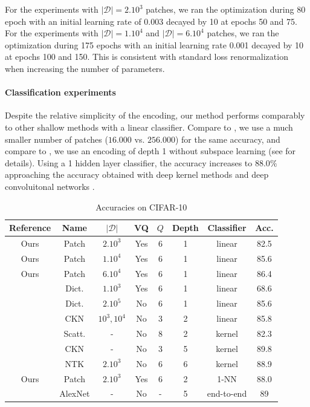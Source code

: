 \documentclass{article}
\begin{document}
{For the experiments with $|\mathcal{D}|=2. 10^3$ patches, we ran the optimization during 80 epoch with an initial learning rate of 0.003 decayed by 10 at epochs 50 and 75.
For the experiments with $|\mathcal{D}|=1.10^4$ and $|\mathcal{D}|=6. 10^4$ patches, we ran the optimization during 175 epochs with an initial learning rate 0.001 decayed by 10 at epochs 100 and  150. This is consistent with standard loss renormalization when increasing the number of parameters.


\paragraph{Classification experiments} Despite the relative simplicity of the encoding, our method performs comparably to other shallow methods with a linear classifier.
Compare to \cite{recht2019imagenet},  we use a much smaller number of patches ($16.000$ vs. $256.000$) for the same accuracy, and compare to \cite{mairal2016end}, we use an encoding of depth 1 without subspace learning (see \cite{mairal2016end} for details).
Using a 1 hidden layer classifier, the accuracy increases to $88.0 \%$ approaching the accuracy obtained with deep kernel methods \citep{li2019enhanced,shankar2020neural} and deep convoluitonal networks \citep{krizhevsky2012imagenet}.



\begin{table}[h]
  \caption{Accuracies on CIFAR-10}
  \label{accuracy}
  \centering
  \begin{tabular}{|c|c|c|c|c|c|c|c|}
    \hline 
    Reference&Name&$|\mathcal{D}|$&VQ&$Q$&Depth &Classifier& Acc. \\
    \hline 
    \hline 
    Ours&Patch&$2.10^3$ & Yes&6&1&linear&82.5 \\
    \hdashline[0.5pt/1pt]
    Ours&Patch&$1.10^4$ & Yes&6&1&linear&85.6\\
    \hdashline[0.5pt/1pt]
    Ours&Patch&$6.10^4$ & Yes&6&1&linear&86.4\\
    \hdashline[0.5pt/1pt]
    \cite{coates2011analysis}&Dict.&$1.10^3$& Yes&6 & 1&linear & 68.6\\
    \hline 
    \cite{recht2019imagenet}&Dict.&$2.10^5$ & No& 6&1&linear &85.6\\
    \hdashline[0.5pt/1pt]
    \cite{mairal2016end}&CKN&$10^3, 10^4$& No&3 & 2& linear &85.8\\
    \hline
     \cite{Oyallon_2015_CVPR}&Scatt.& - & No& 8 &2 & kernel & 82.3\\
    \hdashline[0.5pt/1pt]
    \cite{shankar2020neural}&CKN&-& No&3&5&kernel &89.8\\
    \hdashline[0.5pt/1pt]
    \cite{li2019enhanced}&NTK&$2.10^3$& No&6&6&kernel &88.9\\
    \hline
    Ours&Patch&$2.10^3$ & Yes& 6&2&1-NN&88.0\\
    \hdashline[0.5pt/1pt]
    \cite{krizhevsky2012imagenet}&AlexNet&-& No&-&5&end-to-end&89\\
    \hline
  \end{tabular}
\end{table}




}
\end{document}
